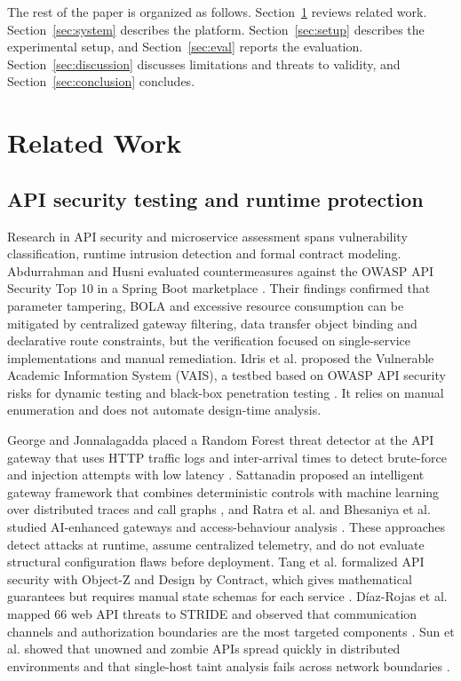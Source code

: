 \documentclass[conference]{IEEEtran}
\begin{document}
The rest of the paper is organized as follows. Section~\ref{sec:related} reviews related work. Section~\ref{sec:system} describes the platform. Section~\ref{sec:setup} describes the experimental setup, and Section~\ref{sec:eval} reports the evaluation. Section~\ref{sec:discussion} discusses limitations and threats to validity, and Section~\ref{sec:conclusion} concludes.

\section{Related Work}\label{sec:related}
\subsection{API security testing and runtime protection}
Research in API security and microservice assessment spans vulnerability classification, runtime intrusion detection and formal contract modeling. Abdurrahman and Husni evaluated countermeasures against the OWASP API Security Top 10 in a Spring Boot marketplace \cite{r1}. Their findings confirmed that parameter tampering, BOLA and excessive resource consumption can be mitigated by centralized gateway filtering, data transfer object binding and declarative route constraints, but the verification focused on single-service implementations and manual remediation. Idris et al. proposed the Vulnerable Academic Information System (VAIS), a testbed based on OWASP API security risks for dynamic testing and black-box penetration testing \cite{r2}. It relies on manual enumeration and does not automate design-time analysis.

George and Jonnalagadda placed a Random Forest threat detector at the API gateway that uses HTTP traffic logs and inter-arrival times to detect brute-force and injection attempts with low latency \cite{r3}. Sattanadin proposed an intelligent gateway framework that combines deterministic controls with machine learning over distributed traces and call graphs \cite{r5}, and Ratra et al. and Bhesaniya et al. studied AI-enhanced gateways and access-behaviour analysis \cite{r7,r8}. These approaches detect attacks at runtime, assume centralized telemetry, and do not evaluate structural configuration flaws before deployment. Tang et al. formalized API security with Object-Z and Design by Contract, which gives mathematical guarantees but requires manual state schemas for each service \cite{r4}. D\'iaz-Rojas et al. mapped 66 web API threats to STRIDE and observed that communication channels and authorization boundaries are the most targeted components \cite{r6}. Sun et al. showed that unowned and zombie APIs spread quickly in distributed environments and that single-host taint analysis fails across network boundaries \cite{r9}.
\end{document}
